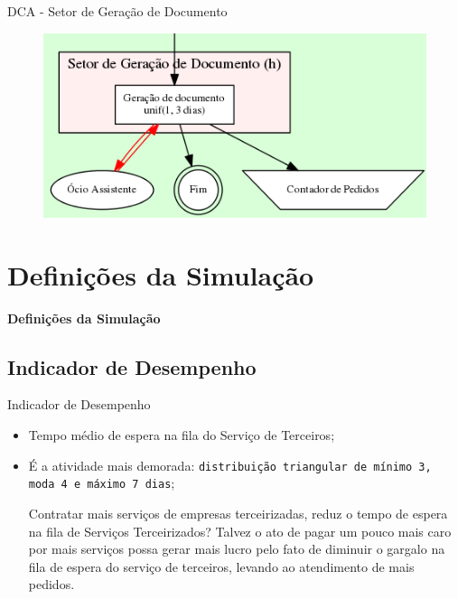 \documentclass[xcolor=dvipsnames]{beamer}
\let\olditem=\item%
\renewcommand{\item}{\olditem \justifying}%
\begin{document}
\begin{frame}{DCA - Setor de Geração de Documento}
	\begin{figure}[H]
		\centering
		\includegraphics[width=1.0\textwidth]{img/h.png}
	\end{figure}
\end{frame}	

\section{Definições da Simulação}

\begin{frame}{}
	\centering
	\Huge \color{blue} \textbf{Definições da Simulação}
\end{frame}
	
\subsection{Indicador de Desempenho}
	
\begin{frame}{Indicador de Desempenho}
	\begin{itemize}
		\item Tempo médio de espera na fila do Serviço de Terceiros;
		      			
		      \bigskip
		      			
		\item É a atividade mais demorada: {\tt distribuição triangular de mínimo 3, moda 4 e máximo 7 dias};
		      			
		      \bigskip
		      			
		      \begin{block}{Contratar mais serviços de empresas terceirizadas, reduz o tempo de espera na fila de Serviços Terceirizados?}
		      	Talvez o ato de pagar um pouco mais caro por mais serviços possa gerar mais lucro pelo fato de diminuir o gargalo na fila de espera do serviço de terceiros, levando ao atendimento de mais pedidos.
		      \end{block}
		      			
	\end{itemize}
\end{frame}
	
\end{document}
